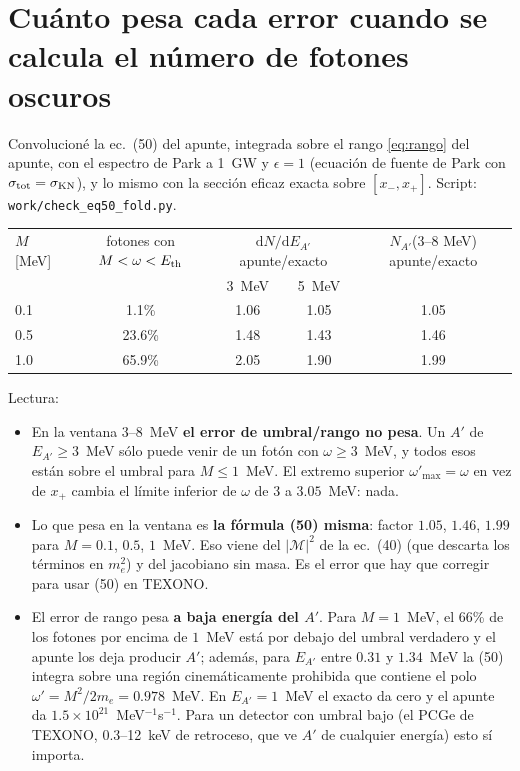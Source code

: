 \documentclass[11pt,a4paper]{article}
\newcommand{\Ap}{A'}
\newcommand{\eps}{\epsilon}
\newcommand{\dd}{\mathrm{d}}
\begin{document}
\section{Cuánto pesa cada error cuando se calcula el número de fotones oscuros}
Convolucioné la ec.~(50) del apunte, integrada sobre el rango \eqref{eq:rango} del apunte, con el espectro de Park a 1~GW y
$\eps=1$ (ecuación de fuente de Park con $\sigma_{\rm tot}=\sigma_{\rm KN}$), y lo mismo con la sección eficaz exacta sobre
$[x_-,x_+]$. Script: \texttt{work/check\_eq50\_fold.py}.

\begin{center}\small
\begin{tabular}{@{}lcccc@{}}
\toprule
$M$ [MeV] & fotones con $M<\omega<E_{\rm th}$ & \multicolumn{2}{c}{$\dd N/\dd E_{\Ap}$ apunte/exacto} & $N_{\Ap}$(3--8 MeV) apunte/exacto\\
 & & 3~MeV & 5~MeV & \\
\midrule
0.1 & 1.1\% & 1.06 & 1.05 & 1.05\\
0.5 & 23.6\% & 1.48 & 1.43 & 1.46\\
1.0 & 65.9\% & 2.05 & 1.90 & 1.99\\
\bottomrule
\end{tabular}
\end{center}

\noindent Lectura:
\begin{itemize}
\item En la ventana 3--8~MeV \textbf{el error de umbral/rango no pesa}. Un $\Ap$ de $E_{\Ap}\ge3$~MeV sólo puede venir de
un fotón con $\omega\ge3$~MeV, y todos esos están sobre el umbral para $M\le1$~MeV. El extremo superior $\omega'_{\max}=\omega$
en vez de $x_+$ cambia el límite inferior de $\omega$ de $3$ a $3.05$~MeV: nada.
\item Lo que pesa en la ventana es \textbf{la fórmula (50) misma}: factor $1.05$, $1.46$, $1.99$ para $M=0.1$, $0.5$,
$1$~MeV. Eso viene del $|\mathcal M|^2$ de la ec.~(40) (que descarta los términos en $m_e^2$) y del jacobiano sin masa.
Es el error que hay que corregir para usar (50) en TEXONO.
\item El error de rango pesa \textbf{a baja energía del $\Ap$}. Para $M=1$~MeV, el 66\% de los fotones por encima de $1$~MeV
está por debajo del umbral verdadero y el apunte los deja producir $\Ap$; además, para $E_{\Ap}$ entre $0.31$ y $1.34$~MeV la
(50) integra sobre una región cinemáticamente prohibida que contiene el polo $\omega'=M^2/2m_e=0.978$~MeV. En
$E_{\Ap}=1$~MeV el exacto da cero y el apunte da $1.5\times10^{21}$~MeV$^{-1}$s$^{-1}$. Para un detector con umbral bajo
(el PCGe de TEXONO, 0.3--12~keV de retroceso, que ve $\Ap$ de cualquier energía) esto sí importa.
\end{itemize}
\end{document}
